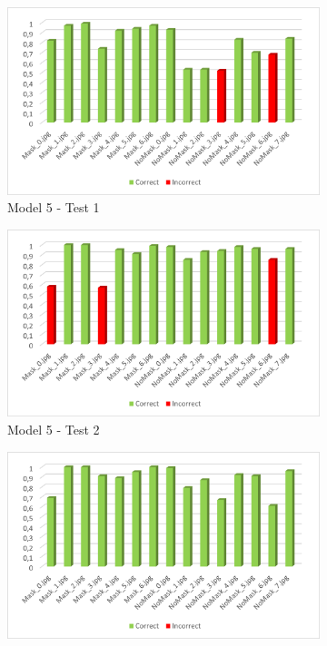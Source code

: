 \documentclass[a4paper,12pt]{article}
\begin{document}
\begin{figure}%
    \centering
    \begin{subfigure}{6cm}
        \includegraphics[width=\linewidth]{images_latex/test5_1.png}
        \caption{Model 5 - Test 1}
    \end{subfigure}
    \qquad
    \begin{subfigure}{6cm}
        \includegraphics[width=\linewidth]{images_latex/test5_2.png}
        \caption{ Model 5 - Test 2}
    \end{subfigure}
    \qquad
    \begin{subfigure}{6cm}
        \includegraphics[width=\linewidth]{images_latex/test5_3.png}

\end{subfigure}
\end{figure}
\end{document}
